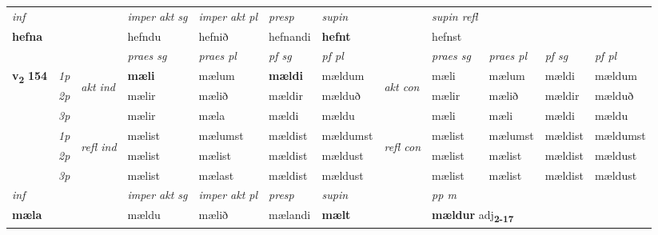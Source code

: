 \begin{longtable}[l]{X>{\footnotesize\itshape}llXXXXlXXXX}
\cmidrule{4-7}
   {\textit{inf}} & &  & \textit{imper akt sg} & \textit{imper akt pl}   & \textit{presp} & \textit{supin} && \textit{supin refl}  \\*
  {\textbf{hefna}} & && hefndu  & hefnið   & hefnandi &  \textbf{hefnt} && hefnst  \\*

\midrule

 & &   & \textit{praes sg}  & \textit{praes pl}    & \textit{ pf sg} & \textit{pf pl} & & \textit{praes sg}  & \textit{praes pl}    & \textit{pf sg} & \textit{pf pl }  \\ \cmidrule{4-7} \cmidrule{9-12}
 \multirow{2}{*}{{{\textbf{v{\textsubscript{2}}} \Large{\textbf{154}}}}}  & 1p & \multirow{3}{*}{\begin{turn}{90}\textit{akt ind}\end{turn}} & \textbf{mæli} & mælum & \textbf{mældi} & mældum & \multirow{3}{*}{\begin{turn}{90}\textit{akt con}\end{turn}} &mæli & mælum & mældi & mældum\\*
 & 2p &  &  mælir  & mælið & mældir & mælduð & & mælir & mælið & mældir & mælduð \\*
 & 3p &  & mælir & mæla & mældi & mældu & & mæli & mæli& mældi & mældu \\*
\cmidrule{4-7} \cmidrule{9-12}
 & 1p & \multirow{3}{*}{\begin{turn}{90}\textit{refl ind}\end{turn}}  & mælist & mælumst & mældist & mældumst & \multirow{3}{*}{\begin{turn}{90}\textit{refl con}\end{turn}}  &mælist & mælumst & mældist & mældumst \\*
 & 2p &  & mælist & mælist & mældist & mældust & &mælist & mælist & mældist & mældust \\*
 & 3p  & & mælist & mælast & mældist & mældust & & mælist & mælist& mældist & mældust \\*
\cmidrule{4-7} \cmidrule{9-12}

   {\textit{inf}} & &  & \textit{imper akt sg} & \textit{imper akt pl}   & \textit{presp} & \textit{supin}  && \textit{pp m} \\*
  {\textbf{mæla}} & && mældu  & mælið   & mælandi &  \textbf{mælt}  && \multicolumn{2}{l}{\textbf{mældur} adj\textbf{\textsubscript{2-17}}} \\*

\midrule


\end{longtable}
